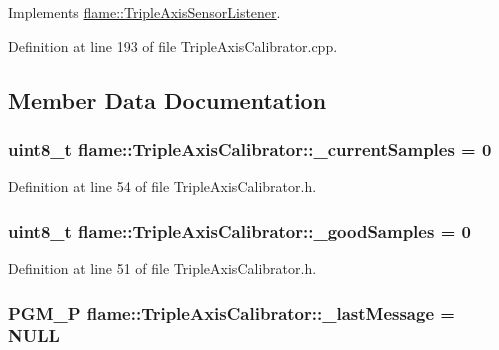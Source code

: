 Implements \hyperlink{classflame_1_1_triple_axis_sensor_listener_a4451e2df32ad722464a1902ef29ed054}{flame\-::\-Triple\-Axis\-Sensor\-Listener}.



Definition at line 193 of file Triple\-Axis\-Calibrator.\-cpp.



\subsection{Member Data Documentation}
\hypertarget{classflame_1_1_triple_axis_calibrator_a802dbf52302b13c65b7d40dca18742bc}{
\subsubsection[{\-\_\-current\-Samples}]{\setlength{\rightskip}{0pt plus 5cm}uint8\-\_\-t flame\-::\-Triple\-Axis\-Calibrator\-::\-\_\-current\-Samples = 0\hspace{0.3cm}{\ttfamily [protected]}}}\label{classflame_1_1_triple_axis_calibrator_a802dbf52302b13c65b7d40dca18742bc}


Definition at line 54 of file Triple\-Axis\-Calibrator.\-h.

\hypertarget{classflame_1_1_triple_axis_calibrator_aa3453c42d8b6f0fdb582d3e722a2db07}{
\subsubsection[{\-\_\-good\-Samples}]{\setlength{\rightskip}{0pt plus 5cm}uint8\-\_\-t flame\-::\-Triple\-Axis\-Calibrator\-::\-\_\-good\-Samples = 0\hspace{0.3cm}{\ttfamily [protected]}}}\label{classflame_1_1_triple_axis_calibrator_aa3453c42d8b6f0fdb582d3e722a2db07}


Definition at line 51 of file Triple\-Axis\-Calibrator.\-h.

\hypertarget{classflame_1_1_triple_axis_calibrator_a2d4c8a4a2944e37341d2e3534a329e24}{
\subsubsection[{\-\_\-last\-Message}]{\setlength{\rightskip}{0pt plus 5cm}P\-G\-M\-\_\-\-P flame\-::\-Triple\-Axis\-Calibrator\-::\-\_\-last\-Message = N\-U\-L\-L\hspace{0.3cm}{\ttfamily [protected]}}}\label{classflame_1_1_triple_axis_calibrator_a2d4c8a4a2944e37341d2e3534a329e24}


